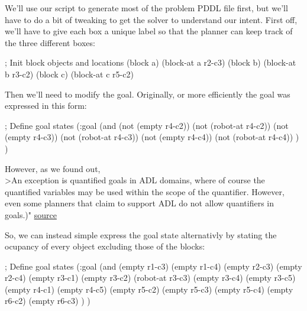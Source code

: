 \documentclass{article}
\newenvironment{Shaded}{}{}
\newcommand{\NormalTok}[1]{{#1}}
\begin{document}
    We'll use our script to generate most of the problem PDDL file first,
but we'll have to do a bit of tweaking to get the solver to understand
our intent. First off, we'll have to give each box a unique label so
that the planner can keep track of the three different boxes:

\begin{Shaded}
\begin{Highlighting}[]
\NormalTok{; Init block objects and locations}
\NormalTok{(block a)}
\NormalTok{(block-at a r2-c3)}
\NormalTok{(block b)}
\NormalTok{(block-at b r3-c2)}
\NormalTok{(block c)}
\NormalTok{(block-at c r5-c2)}
\end{Highlighting}
\end{Shaded}

Then we'll need to modify the goal. Originally, or more efficiently the
goal was expressed in this form:

\begin{Shaded}
\begin{Highlighting}[]
\NormalTok{; Define goal states  }
    \NormalTok{(:goal  }
        \NormalTok{(and  }
            \NormalTok{(not (empty r4-c2)) (not (robot-at r4-c2))}
            \NormalTok{(not (empty r4-c3)) (not (robot-at r4-c3))}
            \NormalTok{(not (empty r4-c4)) (not (robot-at r4-c4))}
        \NormalTok{)}
    \NormalTok{)}
\end{Highlighting}
\end{Shaded}

However, as we found out,\\\textgreater{}An exception is quantified
goals in ADL domains, where of course the quantified variables may be
used within the scope of the quantifier. However, even some planners
that claim to support ADL do not allow quantifiers in goals.)"
\href{http://www.ida.liu.se/~TDDC17/info/labs/planning/2011/writing.html}{source}

So, we can instead simple express the goal state alternativly by stating
the ocupancy of every object excluding those of the blocks:

\begin{Shaded}
\begin{Highlighting}[]
\NormalTok{; Define goal states  }
    \NormalTok{(:goal  }
        \NormalTok{(and  }
            \NormalTok{(empty r1-c3)}
            \NormalTok{(empty r1-c4)}
            \NormalTok{(empty r2-c3)}
            \NormalTok{(empty r2-c4)}
            \NormalTok{(empty r3-c1)}
            \NormalTok{(empty r3-c2)}
            \NormalTok{(robot-at r3-c3)}
            \NormalTok{(empty r3-c4)}
            \NormalTok{(empty r3-c5)}
            \NormalTok{(empty r4-c1)}
            \NormalTok{(empty r4-c5)}
            \NormalTok{(empty r5-c2)}
            \NormalTok{(empty r5-c3)}
            \NormalTok{(empty r5-c4)}
            \NormalTok{(empty r6-c2)}
            \NormalTok{(empty r6-c3)}
        \NormalTok{)}
    \NormalTok{)}
\end{Highlighting}
\end{Shaded}
\end{document}
